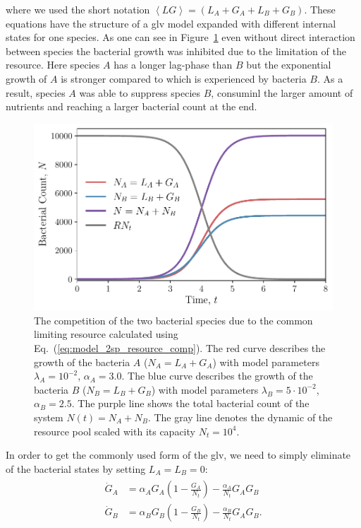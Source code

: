 \documentclass[10pt,twocolumn,5p]{elsarticle}
\numberwithin{equation}{section}
\begin{document}
where we used the short notation $\left<LG\right>=(L_A+G_A+L_B+G_B)$.
These equations have the structure of a \ac{glv} model expanded with different internal states for one species.
As one can see in Figure~\ref{fig:2pool_resource_2sp} even without direct interaction between species the bacterial growth was inhibited due to the limitation of the resource.
Here species $A$ has a longer lag-phase than $B$ but the exponential growth of $A$ is stronger compared to which is experienced by bacteria $B$.
As a result, species $A$ was able to suppress species $B$, consuminl the larger amount of nutrients and reaching a larger bacterial count at the end.
\begin{figure}
    \begin{center}
    \includegraphics[width=0.9\columnwidth]{Figures/pool_model_2pools_resource_competition.pdf}
    \caption{
        The competition of the two bacterial species due to the common limiting resource calculated using Eq.~(\ref{eq:model_2sp_resource_comp}).
        The red curve describes the growth of the bacteria $A$ ($N_A = L_A+G_A$) with model parameters $\lambda_A=10^{-2}$, $\alpha_A=3.0$.
        The blue curve describes the growth of the bacteria $B$ ($N_B = L_B+G_B$) with model parameters $\lambda_B=5\cdot 10^{-2}$, $\alpha_B=2.5$.
        The purple line shows the total bacterial count of the system  $N(t)=N_A+N_B$.
        The gray line denotes the dynamic of the resource pool scaled with its capacity $N_t=10^4$.
    }
    \label{fig:2pool_resource_2sp}
    \end{center}
\end{figure}
%
In order to get the commonly used form of the \ac{glv}, we need to simply eliminate of the bacterial states by setting $L_A=L_B=0$:
\begin{align}
    \begin{split}
        \dot{G}_A &= \alpha_A G_A\left(1 - \frac{G_A}{N_t}\right) - \frac{\alpha_A}{N_t}G_AG_B\\
        \dot{G}_B &= \alpha_B G_B\left(1-\frac{G_B}{N_t}\right) -\frac{\alpha_B}{N_t}G_AG_B. 
    \label{eq:LV_simple}
    \end{split}
\end{align}
\end{document}
